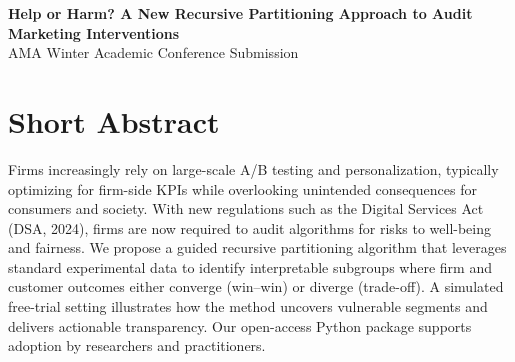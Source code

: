 \documentclass[11pt,letterpaper,english]{article}
\begin{document}
\begin{center}
    \Large \textbf{Help or Harm? A New Recursive Partitioning Approach to Audit Marketing Interventions} \\
    \vspace{0.5cm}
    \large AMA Winter Academic Conference Submission \\
    \normalsize
\end{center}

\section{Short Abstract}
Firms increasingly rely on large-scale A/B testing and personalization, typically optimizing for firm-side KPIs while overlooking unintended consequences for consumers and society. With new regulations such as the Digital Services Act (DSA, 2024), firms are now required to audit algorithms for risks to well-being and fairness. We propose a guided recursive partitioning algorithm that leverages standard experimental data to identify interpretable subgroups where firm and customer outcomes either converge (win–win) or diverge (trade-off). A simulated free-trial setting illustrates how the method uncovers vulnerable segments and delivers actionable transparency. Our open-access Python package supports adoption by researchers and practitioners.

\end{document}
